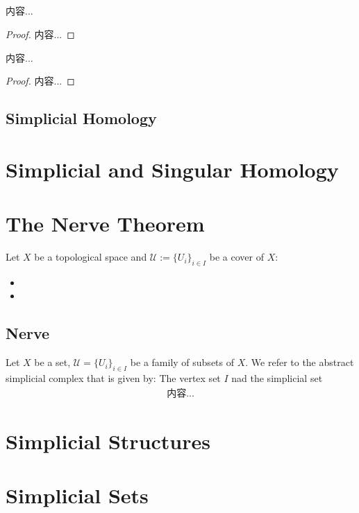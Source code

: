 \documentclass[Total.tex]{subfiles}
\begin{document}
			\subsection{}
			\begin{lemma}
				内容...
			\end{lemma}
			\begin{proof}
				内容...
			\end{proof}
			
			\begin{lemma}
				内容...
			\end{lemma}
			\begin{proof}
				内容...
			\end{proof}
			\subsection{Simplicial Homology}
		\section{Simplicial and Singular Homology}
		\section{The Nerve Theorem}
			\begin{Def}
				Let $X$ be a topological space and $\mathcal{U}:=\{U_i\}_{i\in I}$ be a cover of $X$:
				\begin{itemize}
					\item 
					\item 
				\end{itemize}
			\end{Def}
			\subsection{Nerve} Let $X$ be a set, $\mathcal{U}=\{U_i\}_{i\in I}$ be a family of subsets of $X$. We refer to the abstract simplicial complex that is given by: The vertex set $I$ nad the simplicial set
			\begin{gather*}
				内容...
			\end{gather*}
		\section{Simplicial Structures}
		\section{Simplicial Sets}
\end{document}
